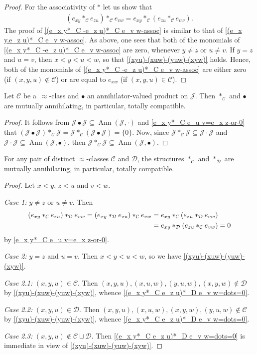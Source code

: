 \documentclass{jonasart}
\newcommand{\bl}{\bullet}
\newcommand{\C}{\mathcal{C}}
\newcommand{\D}{\mathcal{D}}
\newcommand{\J}{\mathcal{J}}
\newcommand{\sst}{\subseteq}
\DeclareMathOperator{\Ann}{Ann}
\begin{document}
\begin{proof}
		For the associativity of $*$ let us show that
		\begin{align}\label{(e_x y*_C -e_z u)*_C e_v w-assoc}
			(e_{xy}*_\C e_{zu})*_\C e_{vw}=e_{xy}*_\C (e_{zu}*_\C e_{vw}).
		\end{align}
		The proof of \eqref{(e_x y*_C -e_z u)*_C e_v w-assoc} is similar to that of \eqref{(e_x y.e_z u)*_C e_v w-assoc}. As above, one sees that both of the monomials of \eqref{(e_x y*_C -e_z u)*_C e_v w-assoc} are zero, whenever $y\ne z$ or $u\ne v$. If $y=z$ and $u=v$, then $x<y<u<w$, so that \eqref{(xyu)-(xuw)-(yuw)-(xyw)} holds. Hence, both of the monomials of \eqref{(e_x y*_C -e_z u)*_C e_v w-assoc} are either zero (if $(x,y,u)\not\in\C$) or are equal to $e_{xw}$ (if $(x,y,u)\in\C$).
	\end{proof}

	\begin{lemma}\label{*_C -tot-comp-with-bl}
		Let $\C$ be a~$\approx$-class and $\bl$ an annihilator-valued product on $\J$. Then $*_\C$ and $\bl$ are mutually annihilating, in particular, totally compatible.
	\end{lemma}

	\begin{proof}
		It follows from $\J\bl \J\sst \Ann(\J,\cdot)$ and \eqref{e_x y*_C e_u v=e_x z-or-0} that $(\J\bl \J)*_\C \J=\J*_\C (\J\bl \J)=\{0\}$. Now, since $\J*_\C\J\sst\J\cdot\J$ and $\J\cdot\J\sst\Ann(\J,\bl)$, then $\J*_\C\J\sst\Ann(\J,\bl)$.
	\end{proof}

	\begin{lemma}\label{*_C -tot-comp-with-*_D}
		For any pair of distinct $\approx$-classes $\C$ and $\D$, the structures $*_\C$ and $*_\D$ are mutually annihilating, in particular, totally compatible.
	\end{lemma}

	\begin{proof}
		Let $x<y$, $z<u$ and $v<w$.

		\textit{Case 1:} $y\ne z$ or $u\ne v$. Then
		\begin{align}
			(e_{xy}*_\C e_{zu})*_\D e_{vw}=(e_{xy}*_\D e_{zu})*_\C e_{vw}&=e_{xy}*_\C (e_{zu}*_\D e_{vw})\notag\\
			&=e_{xy}*_\D (e_{zu}*_\C e_{vw})=0\label{(e_x y*_C e_z u)*_D e_v w=dots=0}
		\end{align}
		by \eqref{e_x y*_C e_u v=e_x z-or-0}.

		\textit{Case 2:} $y=z$ and $u=v$. Then $x<y<u<w$, so we have \eqref{(xyu)-(xuw)-(yuw)-(xyw)}.

		\textit{Case 2.1:} $(x,y,u)\in\C$. Then $(x,y,u),(x,u,w),(y,u,w),(x,y,w)\not\in\D$ by \eqref{(xyu)-(xuw)-(yuw)-(xyw)}, whence \eqref{(e_x y*_C e_z u)*_D e_v w=dots=0}.

		\textit{Case 2.2:} $(x,y,u)\in\D$. Then $(x,y,u),(x,u,w),(x,y,w),(y,u,w)\not\in\C$ by \eqref{(xyu)-(xuw)-(yuw)-(xyw)}, whence \eqref{(e_x y*_C e_z u)*_D e_v w=dots=0}.

		\textit{Case 2.3:} $(x,y,u)\not\in\C\sqcup\D$. Then \eqref{(e_x y*_C e_z u)*_D e_v w=dots=0} is immediate in view of \eqref{(xyu)-(xuw)-(yuw)-(xyw)}.
	\end{proof}
\end{document}
